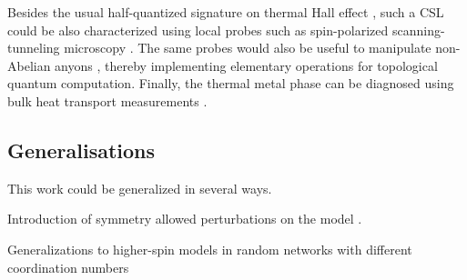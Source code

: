 Besides the usual half-quantized signature on thermal Hall effect \autocite{Kasahara2018,Yokoi2021,Yamashita2020,Bruin2022}, such a CSL could be also characterized using local probes such as spin-polarized scanning-tunneling microscopy \autocite{Feldmeier2020,Konig2020,Udagawa2021}. The same probes would also be useful to manipulate non-Abelian anyons \autocite{Pereira2020}, thereby implementing elementary operations for topological quantum computation. Finally, the thermal metal phase can be diagnosed using bulk heat transport measurements \autocite{Beenakker2013}.

\hypertarget{generalisations}{%
\subsection{Generalisations}\label{generalisations}}

This work could be generalized in several ways.

Introduction of symmetry allowed perturbations on the model \autocite{Rau2014,Chaloupka2010,Chaloupka2013,Chaloupka2015,Winter2016}.

Generalizations to higher-spin models in random networks with different coordination numbers \autocite{Baskaran2008,Yao2009,Nussinov2009,Yao2011,Chua2011,Natori2020,Chulliparambil2020,Chulliparambil2021,Seifert2020,WangHaoranPRB2021,Wu2009}
